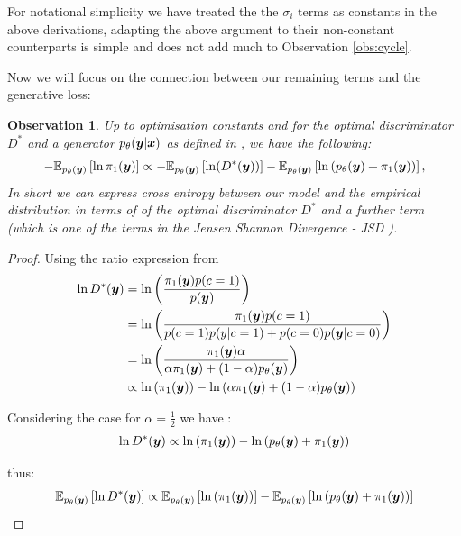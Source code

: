 \documentclass[a4paper,12pt,twoside,openright]{report}
\newtheorem{observation}[theorem]{Observation}
\theoremstyle{definition}
\begin{document}
For notational simplicity we have treated the the $\sigma_i$ terms as constants in the above derivations, adapting the above argument to their non-constant counterparts is simple and does not add much to Observation \ref{obs:cycle}.


 Now we will focus on the connection between our remaining terms and the generative loss:

\begin{observation}
Up to optimisation constants and for the optimal discriminator $D^{*}$ and a generator $p_{\theta}({\bm{y}} | {\bm{x}})$ as defined in \citep{goodfellow2014generative,mohamed2016learning}, we have the following:
\begin{align*}
-\mathbb{E}_{p_{\theta}({\bm{y}})}\left[ \operatorname{ln}  \pi_1({\bm{y}}) \right] \propto-\mathbb{E}_{p_{\theta}({\bm{y}})}\left[\operatorname{ln}(D^{*}({\bm{y}}))\right] - \mathbb{E}_{p_{\theta}({\bm{y}})}\left[\operatorname{ln}\left(p_{\theta}({\bm{y}}) + \pi_1({\bm{y}})\right)\right],
\end{align*}
In short we can express cross entropy between our model and the empirical distribution in terms of of the optimal discriminator $D^{*}$ and a further term (which is one of the terms in the Jensen Shannon Divergence - JSD ). 
\end{observation}
\begin{proof}

Using the ratio expression from \cite{mohamed2016learning}
\begin{align*}
\operatorname{ln} D^{*}({\bm{y}}) &= \operatorname{ln}\left(\frac{\pi_1({\bm{y}})p(c=1)}{p({\bm{y}})}\right) \\
&=\operatorname{ln}\left(\frac{\pi_1({\bm{y}})p(c=1)}{p(c=1)p(y|c=1) + p(c=0)p({\bm{y}}|c=0)}\right) \\
&= \operatorname{ln}\left(\frac{\pi_1({\bm{y}})\alpha}{\alpha\pi_1({\bm{y}}) + (1-\alpha)  p_{\theta}({\bm{y}})}\right) \\
&\propto \operatorname{ln}\left(\pi_1({\bm{y}})\right) - \operatorname{ln}\left(\alpha\pi_1({\bm{y}})  + (1-\alpha)p_{\theta}({\bm{y}}) \right)
\end{align*}

Considering the case for $\alpha=\frac{1}{2}$ we have : 
\begin{align*}
\operatorname{ln} D^{*}({\bm{y}}) \propto \operatorname{ln}\left(\pi_1({\bm{y}})\right) - \operatorname{ln}\left(p_{\theta}({\bm{y}}) + \pi_1({\bm{y}})\right)
\end{align*}

thus:
\begin{align}\label{eq:gan_entropy}
\mathbb{E}_{p_{\theta}({\bm{y}})}\left[\operatorname{ln} D^{*}({\bm{y}})\right] \propto \mathbb{E}_{p_{\theta}({\bm{y}})}\left[\operatorname{ln}\left(\pi_1({\bm{y}})\right)\right] -\mathbb{E}_{p_{\theta}({\bm{y}})}\left[\operatorname{ln}\left(p_{\theta}({\bm{y}}) + \pi_1({\bm{y}})\right)\right]
\end{align}

\end{proof}
\end{document}
